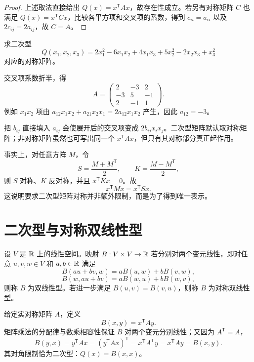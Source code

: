 \begin{proof}
上述取法直接给出 $Q(x)=x^{\mathsf T}Ax$，故存在性成立。若另有对称矩阵 $C$ 也满足 $Q(x)=x^{\mathsf T}Cx$，比较各平方项和交叉项的系数，得到 $c_{ii}=a_{ii}$ 以及 $2c_{ij}=2a_{ij}$，故 $C=A$。
\end{proof}

\begin{example}[title={由多项式写出矩阵}]
求二次型
\[
 Q(x_1,x_2,x_3)=2x_1^2-6x_1x_2+4x_1x_3+5x_2^2-2x_2x_3+x_3^2
\]
对应的对称矩阵。
\begin{solution}
交叉项系数折半，得
\[
A=\begin{pmatrix}
2&-3&2\\
-3&5&-1\\
2&-1&1
\end{pmatrix}.
\]
例如 $x_1x_2$ 项由 $a_{12}x_1x_2+a_{21}x_2x_1=2a_{12}x_1x_2$ 产生，因此 $a_{12}=-3$。
\end{solution}
\end{example}

\begin{pitfall}[交叉项不折半]
把 $b_{ij}$ 直接填入 $a_{ij}$ 会使展开后的交叉项变成 $2b_{ij}x_ix_j$。二次型矩阵默认取对称矩阵；非对称矩阵虽然也可写出同一个 $x^{\mathsf T}Ax$，但只有其对称部分真正起作用。
\end{pitfall}

事实上，对任意方阵 $M$，令
\[
S=\frac{M+M^{\mathsf T}}2,\qquad K=\frac{M-M^{\mathsf T}}2,
\]
则 $S$ 对称、$K$ 反对称，并且 $x^{\mathsf T}Kx=0$。故
\[
x^{\mathsf T}Mx=x^{\mathsf T}Sx.
\]
这说明要求二次型矩阵对称并非额外限制，而是为了得到唯一表示。

\section{二次型与对称双线性型}

\begin{definition}[双线性型与对称双线性型]
设 $V$ 是 $\mathbb{R}$ 上的线性空间。映射 $B:V\times V\to\mathbb{R}$ 若分别对两个变元线性，即对任意 $u,v,w\in V$ 和 $a,b\in\mathbb{R}$ 满足
\[
 B(au+bv,w)=aB(u,w)+bB(v,w),
\]
\[
 B(w,au+bv)=aB(w,u)+bB(w,v),
\]
则称 $B$ 为双线性型。若进一步满足 $B(u,v)=B(v,u)$，则称 $B$ 为对称双线性型。
\end{definition}

给定实对称矩阵 $A$，定义
\[
B(x,y)=x^{\mathsf T}Ay.
\]
矩阵乘法的分配律与数乘相容性保证 $B$ 对两个变元分别线性；又因为 $A^{\mathsf T}=A$，
\[
B(y,x)=y^{\mathsf T}Ax=(y^{\mathsf T}Ax)^{\mathsf T}=x^{\mathsf T}A^{\mathsf T}y=x^{\mathsf T}Ay=B(x,y).
\]
其对角限制恰为二次型：$Q(x)=B(x,x)$。


